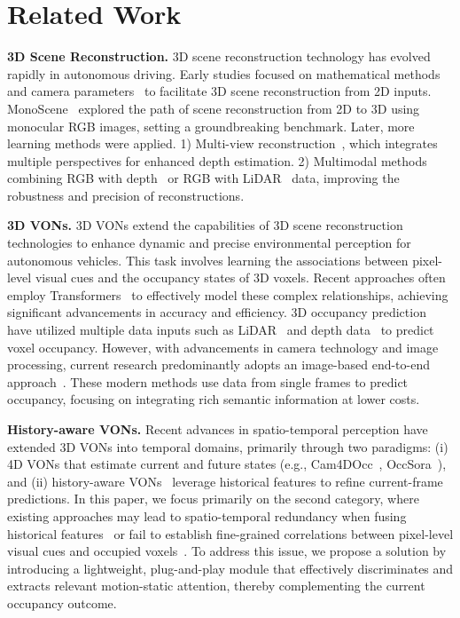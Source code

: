 \section{Related Work}
\label{sec:relate}
\noindent\textbf{3D Scene Reconstruction.} 3D scene reconstruction technology has evolved rapidly in autonomous driving. Early studies focused on mathematical methods~\cite{MonoScene} and camera parameters~\cite{3D_reconstruction_camera_para_1,3D_reconstruction_camera_para_2,3D_reconstruction_camera_para_3} to facilitate 3D scene reconstruction from 2D inputs. MonoScene~\cite{MonoScene} explored the path of scene reconstruction from 2D to 3D using monocular RGB images, setting a groundbreaking benchmark. Later, more learning methods were applied. 1) Multi-view reconstruction~\cite{Multi_View_reconstruction_1, Multi_View_reconstruction_2}, which integrates multiple perspectives for enhanced depth estimation. 2) Multimodal methods combining RGB with depth~\cite{multimodal_rgb_depth_1, multimodal_rgb_depth_2} or RGB with LiDAR~\cite{multimodal_rgb_lidar_1} data, improving the robustness and precision of reconstructions. 

\noindent\textbf{3D VONs.} 3D VONs extend the capabilities of 3D scene reconstruction technologies to enhance dynamic and precise environmental perception for autonomous vehicles. This task involves learning the associations between pixel-level visual cues and the occupancy states of 3D voxels. Recent approaches often employ Transformers~\cite{attention_is_all_you_need} to effectively model these complex relationships, achieving significant advancements in accuracy and efficiency. 3D occupancy prediction have utilized multiple data inputs such as LiDAR~\cite{Panoptic_PolarNet,PointOcc} and depth data~\cite{S3CNet_depth,Li_2019_CVPR_depth,Li_2020_CVPR_depth,See_and_think_depth,Li_Zou_Li_Zhao_Gao_2020_depth,Depth_Based_Semantic_Scene_depth,Two_Stream_3D_Semantic_Scene_Completion_depth} to predict voxel occupancy. However, with advancements in camera technology and image processing, current research predominantly adopts an image-based end-to-end approach~\cite{surroundOcc,TPVFormer,VoxFormer,selfocc,RenderOcc}. These modern methods use data from single frames to predict occupancy, focusing on integrating rich semantic information at lower costs. 

\noindent\textbf{History-aware VONs.} Recent advances in spatio-temporal perception have extended 3D VONs into temporal domains, primarily through two paradigms: (i) 4D VONs that estimate current and future states (e.g., Cam4DOcc~\cite{Cam4docc}, OccSora~\cite{OccSora}), and (ii) history-aware VONs~\cite{fb_occ,SparseOcc_Liu,bevdet4d,opus} leverage historical features to refine current-frame predictions. In this paper, we focus primarily on the second category, where existing approaches may lead to spatio-temporal redundancy when fusing historical features~\cite{opus} or fail to establish fine-grained correlations between pixel-level visual cues and occupied voxels~\cite{bevdet4d}. To address this issue, we propose a solution by introducing a lightweight, plug-and-play module that effectively discriminates and extracts relevant motion-static attention, thereby complementing the current occupancy outcome.

